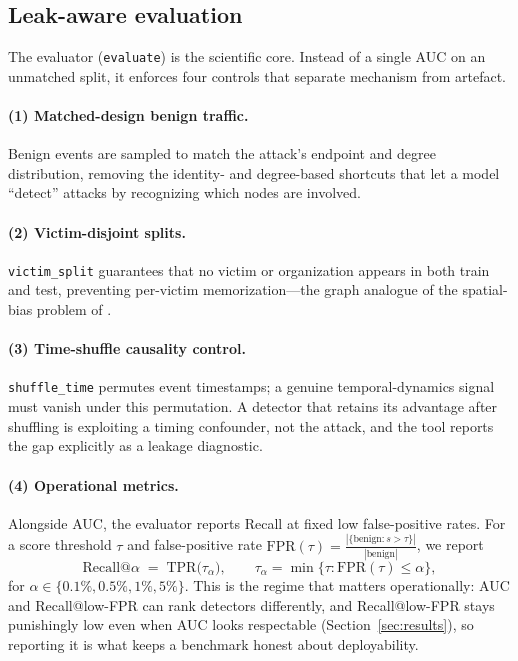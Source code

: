 \subsection{Leak-aware evaluation}
\label{sec:leak}
The evaluator (\texttt{evaluate}) is the scientific core. Instead of a single AUC on an
unmatched split, it enforces four controls that separate mechanism from artefact.

\paragraph{(1) Matched-design benign traffic.} Benign events are sampled to match the
attack's endpoint and degree distribution, removing the identity- and degree-based
shortcuts that let a model ``detect'' attacks by recognizing which nodes are involved.

\paragraph{(2) Victim-disjoint splits.} \texttt{victim\_split} guarantees that no victim or
organization appears in both train and test, preventing per-victim memorization---the
graph analogue of the spatial-bias problem of \citet{pendlebury2019tesseract}.

\paragraph{(3) Time-shuffle causality control.} \texttt{shuffle\_time} permutes event
timestamps; a genuine temporal-dynamics signal must vanish under this permutation. A
detector that retains its advantage after shuffling is exploiting a timing confounder, not
the attack, and the tool reports the gap explicitly as a leakage diagnostic.

\paragraph{(4) Operational metrics.} Alongside AUC, the evaluator reports Recall at fixed
low false-positive rates. For a score threshold $\tau$ and false-positive rate
$\mathrm{FPR}(\tau)=\frac{|\{\text{benign}: s>\tau\}|}{|\text{benign}|}$, we report
\[
  \mathrm{Recall@}\alpha \;=\; \mathrm{TPR}\!\big(\tau_\alpha\big),\qquad
  \tau_\alpha=\min\{\tau:\mathrm{FPR}(\tau)\le\alpha\},
\]
for $\alpha\in\{0.1\%,0.5\%,1\%,5\%\}$. This is the regime that matters operationally: AUC and
Recall@low-FPR can rank detectors differently, and Recall@low-FPR stays punishingly low even
when AUC looks respectable (Section~\ref{sec:results}), so reporting it is what keeps a
benchmark honest about deployability.

